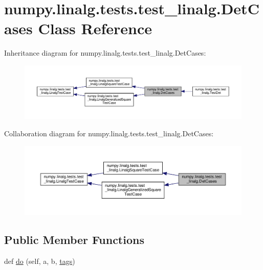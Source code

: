 \hypertarget{classnumpy_1_1linalg_1_1tests_1_1test__linalg_1_1DetCases}{}\section{numpy.\+linalg.\+tests.\+test\+\_\+linalg.\+Det\+Cases Class Reference}
\label{classnumpy_1_1linalg_1_1tests_1_1test__linalg_1_1DetCases}


Inheritance diagram for numpy.\+linalg.\+tests.\+test\+\_\+linalg.\+Det\+Cases\+:
\nopagebreak
\begin{figure}[H]
\begin{center}
\leavevmode
\includegraphics[width=350pt]{classnumpy_1_1linalg_1_1tests_1_1test__linalg_1_1DetCases__inherit__graph}
\end{center}
\end{figure}


Collaboration diagram for numpy.\+linalg.\+tests.\+test\+\_\+linalg.\+Det\+Cases\+:
\nopagebreak
\begin{figure}[H]
\begin{center}
\leavevmode
\includegraphics[width=350pt]{classnumpy_1_1linalg_1_1tests_1_1test__linalg_1_1DetCases__coll__graph}
\end{center}
\end{figure}
\subsection*{Public Member Functions}
\begin{DoxyCompactItemize}
\item 
def \hyperlink{classnumpy_1_1linalg_1_1tests_1_1test__linalg_1_1DetCases_a2fc3bc762f2ec5f23df07c587d027f3d}{do} (self, a, b, \hyperlink{namespacenumpy_1_1linalg_1_1tests_1_1test__linalg_ac6a064918e74d701a7b5aac0ffefe1e7}{tags})
\end{DoxyCompactItemize}

